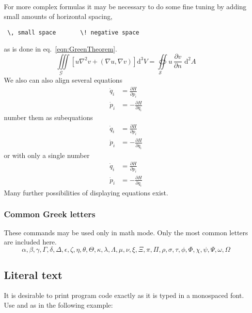 For more complex formulas it may be necessary to do some fine tuning by adding small amounts of horizontal spacing, 
\begin{verbatim}
 \, small space       \! negative space
\end{verbatim}
as is done in eq.~\eqref{eqn:GreenTheorem}.
\begin{equation}
  \underset{\mathcal{G}\quad}\iiint\!
  \left[u\nabla^{2}v+\left(\nabla  u,\nabla  v\right)\right]\mathrm{d}^{3}V
  =\underset{\mathcal{S}\quad}\oiint  u\,\frac{\partial v}{\partial n}
  \,\,\mathrm{d}^{2}A
  \label{eqn:GreenTheorem}
\end{equation}
We also can also align several equations
\begin{align}
  \dot{q}_i & = \frac{\partial H}{\partial p_i} \\
  \dot{p}_i & = -\frac{\partial H}{\partial q_i} 
\end{align}
number them as subequations
\begin{subequations}
\begin{align}
  \dot{q}_i & = \frac{\partial H}{\partial p_i} \\
  \dot{p}_i & = -\frac{\partial H}{\partial q_i} 
\end{align}
\end{subequations}
or with only a single number
\begin{equation}
\begin{aligned}
  \dot{q}_i & = \frac{\partial H}{\partial p_i} \\
  \dot{p}_i & = -\frac{\partial H}{\partial q_i} 
\end{aligned}
\end{equation}
Many further possibilities of displaying equations exist. 

\subsubsection{Common Greek letters}
\label{sec:example:math:greekletters}
These commands may be used only in math mode. Only the most common
letters are included here.
%
\[\alpha, \beta, \gamma, \Gamma, \delta,\Delta,
\epsilon, \zeta, \eta, \theta, \Theta, \kappa,
\lambda, \Lambda, \mu, \nu, \xi, \Xi, \pi, \Pi,
\rho, \sigma, \tau, \phi, \Phi, \chi, \psi, \Psi,
\omega, \Omega\]

\subsection{Literal text}
\label{sec:example:verbatim}
%
It is desirable to print program code exactly as it is typed in a
monospaced font. Use  and
 as in the following example:

